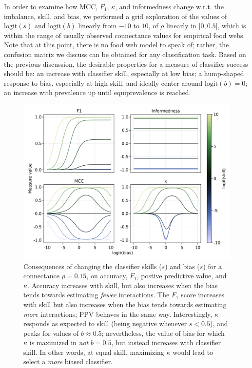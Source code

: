 \documentclass[11pt]{article}
\makeatletter
\def\maxwidth{\ifdim\Gin@nat@width>\linewidth\linewidth
\else\Gin@nat@width\fi}
\let\Oldincludegraphics\includegraphics
\renewcommand{\includegraphics}[1]{\Oldincludegraphics[width=\maxwidth]{#1}}
\makeatother
\begin{document}
In order to examine how MCC, \(F_1\), \(\kappa\), and informedness
change w.r.t. the imbalance, skill, and bias, we performed a grid
exploration of the values of \(\text{logit}(s)\) and \(\text{logit}(b)\)
linearly from \(-10\) to \(10\), of \(\rho\) linearly in \(]0, 0.5]\),
which is within the range of usually observed connectance values for
empirical food webs. Note that at this point, there is no food web model
to speak of; rather, the confusion matrix we discuss can be obtained for
any classification task. Based on the previous discussion, the desirable
properties for a measure of classifier success should be: an increase
with classifier skill, especially at low bias; a hump-shaped response to
bias, especially at high skill, and ideally center around
\(\text{logit}(b)=0\); an increase with prevalence up until
equiprevalence is reached.

\begin{figure}
\hypertarget{fig:bias}{%
\centering
\includegraphics{figures/changing-bias.png}
\caption{Consequences of changing the classifier skills (\(s\)) and bias
(\(s\)) for a connectance \(\rho=0.15\), on accuracy, \(F_1\), postive
predictive value, and \(\kappa\). Accuracy increases with skill, but
also increases when the bias tends towards estimating \emph{fewer}
interactions. The \(F_1\) score increases with skill but also increases
when the bias tends towards estimating \emph{more} interactions; PPV
behaves in the same way. Interestingly, \(\kappa\) responds as expected
to skill (being negative whenever \(s < 0.5\)), and peaks for values of
\(b \approx 0.5\); nevertheless, the value of bias for which \(\kappa\)
is maximized in \emph{not} \(b=0.5\), but instead increases with
classifier skill. In other words, at equal skill, maximizing \(\kappa\)
would lead to select a \emph{more} biased classifier.}\label{fig:bias}
}
\end{figure}
\end{document}
